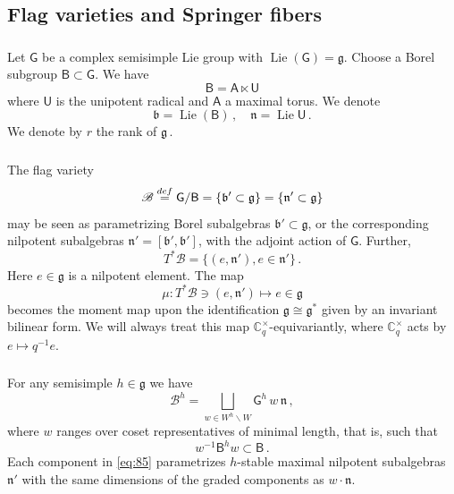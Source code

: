 \documentclass[14pt]{extarticle}
\newcommand{\Ct}{\mathbb{C}^\times}
\newcommand{\bA}{\mathsf{A}}
\newcommand{\bG}{\mathsf{G}}
\newcommand{\bU}{\mathsf{U}}
\newcommand{\bB}{\mathsf{B}}
\newcommand{\cB}{\mathscr{B}}
\newcommand{\fg}{\mathfrak{g}}
\newcommand{\fn}{\mathfrak{n}}
\newcommand{\fb}{\mathfrak{b}}
\DeclareMathOperator{\Lie}{Lie}
\theoremstyle{definition}
\begin{document}
\subsection{Flag varieties and Springer fibers}\label{a_Lie} 

\subsubsection{}\label{s_Lie_def}

Let $\bG$ be a complex semisimple Lie group with $\Lie(\bG)=\fg$. Choose a
Borel subgroup $\bB
\subset \bG$. We have 
\[
  \bB = \bA \ltimes \bU
\]
where $\bU$ is the unipotent radical and $\bA$ a maximal torus. We denote
\[
  \fb = \Lie (\bB)\,, \quad \fn = \Lie \bU \,.
\]
We denote by $r$ the rank of $\fg$\,. 

\subsubsection{} 

The flag variety
\[
  \cB \overset{\textup{\tiny def}}= \bG/\bB  = \{ \fb' \subset \fg \} = \{ \fn' \subset \fg \}
\]
may be seen as parametrizing Borel subalgebras $\fb' \subset
\fg$, or the corresponding nilpotent subalgebras $\fn' = [ \fb',
\fb']$, 
with the adjoint action of $\bG$. Further, 
%
\begin{equation}
T^* \cB = \{(e,\fn'), e \in \fn'\} \,. \label{TsB}
\end{equation}
%
Here $e\in \fg$ is a nilpotent element. The map
%
\begin{equation}
\mu: T^*\cB \owns (e,\fn') \mapsto e \in \fg\label{eq:144}
\end{equation}
%
becomes the moment map upon the identification
$\fg \cong \fg^*$ given by an invariant bilinear form. We
will always treat this map $\Ct_q$-equivariantly,
where $\Ct_q$ acts by $e \mapsto q^{-1} e$. 

\subsubsection{}\label{A_Bh}

For any semisimple $h\in \fg$ we have 
%
\begin{equation}
\cB^h = \bigsqcup_{w\in W^h\backslash W} \bG^h \, w \, \fn
\,, \label{eq:85}
\end{equation}
%
where $w$ ranges over coset representatives of minimal length, that
is, such that
\[
  w^{-1} \bB^h w \subset \bB \,.
\]
Each component in \eqref{eq:85} parametrizes $h$-stable maximal
nilpotent subalgebras $\fn'$ with the same dimensions of the graded
components as $w \cdot \fn$.
\end{document}
